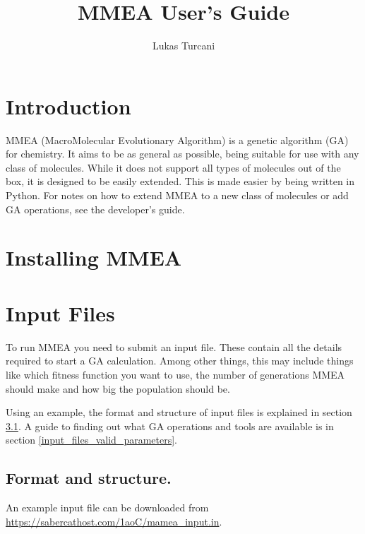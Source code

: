 \documentclass{article}
\title{MMEA User's Guide}
\author{Lukas Turcani}
\begin{document}
\begin{titlepage}
	\maketitle
\end{titlepage}

\tableofcontents
\newpage
\section{Introduction}
MMEA (MacroMolecular Evolutionary Algorithm) is a genetic algorithm (GA) for chemistry. It aims to be as general as possible, being suitable for use with any class of molecules. While it does not support all types of molecules out of the box, it is designed to be easily extended. This is made easier by being written in Python. For notes on how to extend MMEA to a new class of molecules or add GA operations, see the developer's guide.

\section{Installing MMEA}

\section{Input Files}

To run MMEA you need to submit an input file. These contain all the details required to start a GA calculation. Among other things, this may include things like which fitness function you want to use, the number of generations MMEA should make and how big the population should be.

Using an example, the format and structure of input files is explained in section \ref{input_files_format_and_structure}. A guide to finding out what GA operations and tools are available is in section \ref{input_files_valid_parameters}.

\subsection{Format and structure.}
\label{input_files_format_and_structure}

An example input file can be downloaded from \url{https://sabercathost.com/1aoC/mamea_input.in}.
\end{document}
